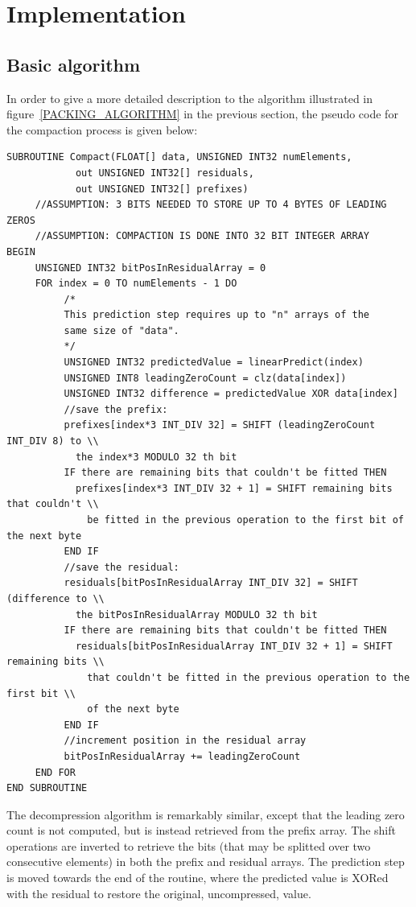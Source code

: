 \section{Implementation}
 \subsection{Basic algorithm}
  In order to give a more detailed description to the algorithm illustrated in figure~\ref{PACKING_ALGORITHM} in the previous section, the pseudo code for the compaction
  process is given below:
\begin{verbatim}
SUBROUTINE Compact(FLOAT[] data, UNSIGNED INT32 numElements, 
		    out UNSIGNED INT32[] residuals, 
		    out UNSIGNED INT32[] prefixes)
	 //ASSUMPTION: 3 BITS NEEDED TO STORE UP TO 4 BYTES OF LEADING ZEROS
	 //ASSUMPTION: COMPACTION IS DONE INTO 32 BIT INTEGER ARRAY
BEGIN
	 UNSIGNED INT32 bitPosInResidualArray = 0
	 FOR index = 0 TO numElements - 1 DO
		  /*
		  This prediction step requires up to "n" arrays of the 
		  same size of "data".
		  */
		  UNSIGNED INT32 predictedValue = linearPredict(index) 
		  UNSIGNED INT8 leadingZeroCount = clz(data[index])
		  UNSIGNED INT32 difference = predictedValue XOR data[index]
		  //save the prefix:
		  prefixes[index*3 INT_DIV 32] = SHIFT (leadingZeroCount INT_DIV 8) to \\
		    the index*3 MODULO 32 th bit
		  IF there are remaining bits that couldn't be fitted THEN
		    prefixes[index*3 INT_DIV 32 + 1] = SHIFT remaining bits that couldn't \\
		      be fitted in the previous operation to the first bit of the next byte
		  END IF
		  //save the residual:
		  residuals[bitPosInResidualArray INT_DIV 32] = SHIFT (difference to \\
		    the bitPosInResidualArray MODULO 32 th bit
		  IF there are remaining bits that couldn't be fitted THEN
		    residuals[bitPosInResidualArray INT_DIV 32 + 1] = SHIFT remaining bits \\
		      that couldn't be fitted in the previous operation to the first bit \\
		      of the next byte
		  END IF  
		  //increment position in the residual array
		  bitPosInResidualArray += leadingZeroCount
	 END FOR
END SUBROUTINE 
\end{verbatim}
The decompression algorithm is remarkably similar, except that the leading zero count is not computed, but is instead retrieved from the prefix array. The shift
operations are inverted to retrieve the bits (that may be splitted over two consecutive elements) in both the prefix and residual arrays. The prediction step is moved towards
the end of the routine, where the predicted value is XORed with the residual to restore the original, uncompressed, value.
